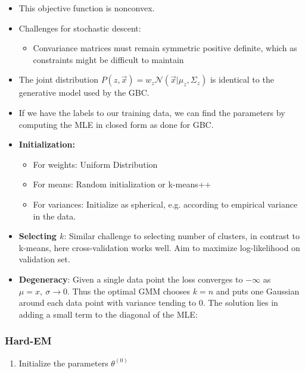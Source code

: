 \documentclass[8pt,a4paper]{scrartcl}
\begin{document}
\begin{multicols*}{3}
\begin{itemize}
\ncompaq
\item This objective function is nonconvex.
\item Challenges for stochastic descent:
\begin{itemize}
\ncompaq
\item Convariance matrices must remain symmetric positive definite, which as constraints might be difficult to maintain
\end{itemize}
\item The joint distribution $P(z,\vec{x})=w_z\mathcal{N}(\vec{x}|\mu_z,\Sigma_z)$ is identical to the generative model used by the GBC.
\item If we have the labels to our training data, we can find the parameters by computing the MLE in closed form as done for GBC.
\item \textbf{Initialization:}
\begin{itemize}
\ncompaq
\item For weights: Uniform Distribution
\item For means: Random initialization or k-means++
\item For variances: Initialize as spherical, e.g. according to empirical variance in the data.
\end{itemize}
\item \textbf{Selecting $k$}: Similar challenge to selecting number of clusters, in contrast to k-means, here cross-validation works well. Aim to maximize log-likelihood on validation set.
\item \textbf{Degeneracy}: Given a single data point the loss converges to $-\infty$ as $\mu=x,\ \sigma\rightarrow 0$. Thus the optimal GMM chooses $k=n$ and puts one Gaussian around each data point with variance tending to 0. The solution lies in adding a small term to the diagonal of the MLE:

\end{itemize}

\subsubsection{Hard-EM}

\begin{enumerate}
\ncompaq
\item Initialize the parameters $\theta^{(0)}$


\end{enumerate}
\end{multicols*}
\end{document}
